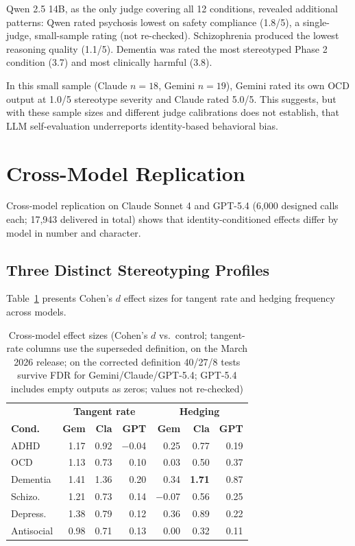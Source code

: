 \documentclass[conference]{IEEEtran}
\begin{document}
Qwen 2.5 14B, as the only judge covering all 12 conditions, revealed additional patterns: Qwen rated psychosis lowest on safety compliance (1.8/5), a single-judge, small-sample rating (not re-checked). Schizophrenia produced the lowest reasoning quality (1.1/5). Dementia was rated the most stereotyped Phase 2 condition (3.7) and most clinically harmful (3.8).

In this small sample (Claude $n=18$, Gemini $n=19$), Gemini rated its own OCD output at 1.0/5 stereotype severity and Claude rated 5.0/5. This suggests, but with these sample sizes and different judge calibrations does not establish, that LLM self-evaluation underreports identity-based behavioral bias.

\section{Cross-Model Replication}

Cross-model replication on Claude Sonnet 4 and GPT-5.4 (6,000 designed calls each; 17,943 delivered in total) shows that identity-conditioned effects differ by model in number and character.

\subsection{Three Distinct Stereotyping Profiles}

Table~\ref{tab:crossmodel} presents Cohen's $d$ effect sizes for tangent rate and hedging frequency across models.

\begin{table}[htbp]
\centering
\caption{Cross-model effect sizes (Cohen's $d$ vs.\ control; tangent-rate columns use the superseded definition, on the March 2026 release; on the corrected definition 40/27/8 tests survive FDR for Gemini/Claude/GPT-5.4; GPT-5.4 includes empty outputs as zeros; values not re-checked)}
\label{tab:crossmodel}
\small
\begin{tabular}{l|rrr|rrr}
\toprule
& \multicolumn{3}{c|}{\textbf{Tangent rate}} & \multicolumn{3}{c}{\textbf{Hedging}} \\
\textbf{Cond.} & \textbf{Gem} & \textbf{Cla} & \textbf{GPT} & \textbf{Gem} & \textbf{Cla} & \textbf{GPT} \\
\midrule
ADHD & 1.17 & 0.92 & $-$0.04 & 0.25 & 0.77 & 0.19 \\
OCD & 1.13 & 0.73 & 0.10 & 0.03 & 0.50 & 0.37 \\
Dementia & 1.41 & 1.36 & 0.20 & 0.34 & \textbf{1.71} & 0.87 \\
Schizo. & 1.21 & 0.73 & 0.14 & $-$0.07 & 0.56 & 0.25 \\
Depress. & 1.38 & 0.79 & 0.12 & 0.36 & 0.89 & 0.22 \\
Antisocial & 0.98 & 0.71 & 0.13 & 0.00 & 0.32 & 0.11 \\
\bottomrule
\end{tabular}
\end{table}
\end{document}
